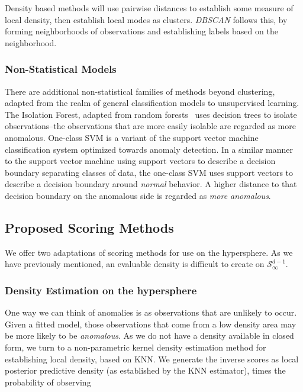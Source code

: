 Density based methods will use pairwise distances to establish some measure of local density, then
  establish local modes as clusters.  \emph{DBSCAN} \citep{ester1996} follows this, by forming
  neighborhoods of observations and establishing labels based on the neighborhood.

\subsubsection{Non-Statistical Models}
There are additional non-statistical families of methods beyond clustering, adapted from the realm
  of general classification models to unsupervised learning.  The Isolation Forest,\citep{liu2000}
  adapted from random forests~\citep{breiman2001} uses decision trees to isolate observations--the
  observations that are more easily isolable are regarded as more anomalous.  One-class SVM
  \citep{chang2011} is a variant of the support vector machine classification system optimized towards
  anomaly detection. In a similar manner to the support vector machine using support vectors to
  describe a decision boundary separating classes of data, the one-class SVM uses support vectors to
  describe a decision boundary around \emph{normal} behavior.  A higher distance to that decision
  boundary on the anomalous side is regarded as \emph{more anomalous}.

\subsection{Proposed Scoring Methods}
We offer two adaptations of scoring methods for use on the hypersphere.  As we have previously
  mentioned, an evaluable density is difficult to create on $\mathcal{S}_{\infty}^{d-1}$.

\subsubsection{Density Estimation on the hypersphere}
One way we can think of anomalies is as observations that are unlikely to occur.  Given a fitted model,
  those observations that come from a low density area may be more likely to be \emph{anomalous}.
  As we do not have a density available in closed form, we turn to a non-parametric kernel density
  estimation method for establishing local density, based on KNN.  We generate the inverse scores as
  local posterior predictive density (as established by the KNN estimator), times the probability of
  observing

